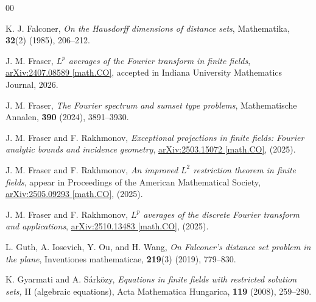 \documentclass[11pt]{article}
\begin{document}
\begin{thebibliography}{00}


K. J. Falconer, \textit{On the Hausdorff dimensions of distance sets}, Mathematika, \textbf{32}(2) (1985), 206--212.

J. M. Fraser, \textit{$L^p$ averages of the Fourier transform in finite fields}, 
\href{https://arxiv.org/abs/2407.08589}{arXiv:2407.08589 [math.CO]}, accepted in Indiana University Mathematics Journal, 2026.


J. M. Fraser, \textit{The Fourier spectrum and sumset type problems}, Mathematische Annalen, \textbf{390} (2024), 3891--3930.

J. M. Fraser and F. Rakhmonov, \textit{Exceptional projections in finite fields: Fourier analytic bounds and incidence geometry},  \href{https://arxiv.org/abs/2503.15072}{arXiv:2503.15072 [math.CO]}, (2025).

J. M. Fraser and F. Rakhmonov, \textit{An improved $L^2$ restriction theorem in finite fields}, appear in Proceedings of the American Mathematical Society,
\href{https://arxiv.org/abs/2505.09293}{arXiv:2505.09293 [math.CO]}, (2025).



J. M. Fraser and F. Rakhmonov, \textit{$L^p$ averages of the discrete Fourier transform and applications}, 
\href{https://arxiv.org/abs/2510.13483}{arXiv:2510.13483 [math.CO]}, (2025).





L. Guth, A. Iosevich, Y. Ou, and H. Wang, \textit{On Falconer's distance set problem in the plane}, Inventiones mathematicae, \textbf{219}(3) (2019), 779--830.

K. Gyarmati and A. S\'{a}rk\"{o}zy, \textit{Equations in finite fields with restricted solution sets,} II (algebraic equations), Acta Mathematica Hungarica, \textbf{119} (2008), 259--280.


\end{thebibliography}
\end{document}
